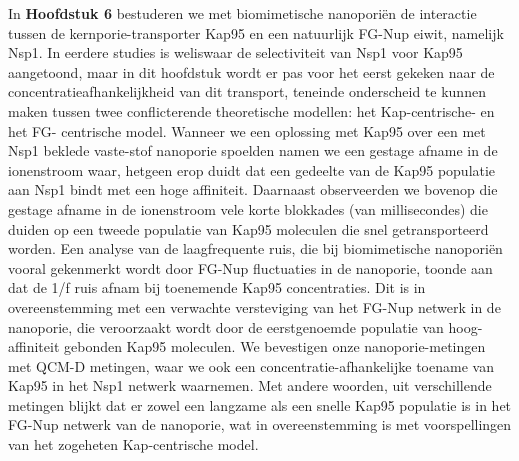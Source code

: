 {	
	\noindent In \textbf{Hoofdstuk 6} bestuderen we met biomimetische nano\-poriën de interactie tussen de kernporie-transporter Kap95 en een natuurlijk FG-Nup eiwit, namelijk Nsp1. In eerdere studies is weliswaar de selectiviteit van Nsp1 voor Kap95 aangetoond, maar in dit hoofdstuk wordt er pas voor het eerst gekeken naar de concentratieafhankelijkheid van dit transport, teneinde onderscheid te kunnen maken tussen twee conflicterende theoretische modellen: het Kap-centrische- en het FG- centrische model. Wanneer we een oplossing met Kap95 over een met Nsp1 beklede vaste-stof nanoporie spoelden namen we een gestage afname in de ionenstroom waar, hetgeen erop duidt dat een gedeelte van de Kap95 populatie aan Nsp1 bindt met een hoge affiniteit. Daarnaast observeerden we bovenop die gestage afname in de ionenstroom vele korte blokkades (van millisecondes) die duiden op een tweede populatie van Kap95 moleculen die snel getransporteerd worden. Een analyse van de laagfrequente ruis, die bij biomimetische nano\-poriën vooral gekenmerkt wordt door FG-Nup fluctuaties in de nanoporie, toonde aan dat de 1/f ruis afnam bij toenemende Kap95 concentraties. Dit is in overeenstemming met een verwachte versteviging van het FG-Nup netwerk in de nanoporie, die veroorzaakt wordt door de eerstgenoemde populatie van hoog-affiniteit gebonden Kap95 moleculen. We bevestigen onze nanoporie-metingen met QCM-D metingen, waar we ook een concentratie-afhankelijke toename van Kap95 in het Nsp1 netwerk waarnemen. Met andere woorden, uit verschillende metingen blijkt dat er zowel een langzame als een snelle Kap95 populatie is in het FG-Nup netwerk van de nanoporie, wat in overeenstemming is met voorspellingen van het zogeheten Kap-centrische model.\\[0.5pt]
	
}
